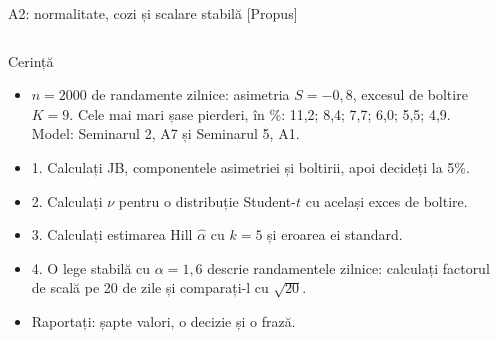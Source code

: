 \begin{frame}{A2: normalitate, cozi și scalare stabilă [Propus]}
\propsub
\itemsize{\scriptsize}
\begin{columns}[T]
\begin{column}{\taskw}
\begin{block}{Cerință}
\begin{itemize}
    \item $n = 2000$ de randamente zilnice: asimetria $S = -0{,}8$, excesul de boltire $K = 9$. Cele mai mari șase pierderi, în \%: 11,2; 8,4; 7,7; 6,0; 5,5; 4,9. Model: Seminarul 2, A7 și Seminarul 5, A1.
    \item 1. Calculați JB, componentele asimetriei și boltirii, apoi decideți la 5\%.
    \item 2. Calculați $\nu$ pentru o distribuție Student-$t$ cu același exces de boltire.
    \item 3. Calculați estimarea Hill $\hat\alpha$ cu $k = 5$ și eroarea ei standard.
    \item 4. O lege stabilă cu $\alpha = 1{,}6$ descrie randamentele zilnice: calculați factorul de scală pe 20 de zile și comparați-l cu $\sqrt{20}$.
    \item Raportați: șapte valori, o decizie și o frază.
\end{itemize}
\end{block}
\end{column}
\begin{column}{\solw}
\end{column}
\end{columns}
\end{frame}

